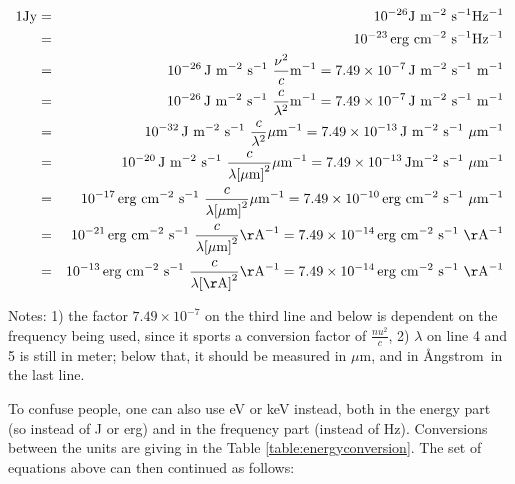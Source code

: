 \documentclass[12pt,a4paper]{article}
\newcommand{\micron}{\ensuremath{\mu \mathrm{m}}}
\newcommand{\Angstrom}{{\AA}ngstrom}
\newcommand{\jmsqshz}{\ensuremath{\mathrm{J}\ \mathrm{m}^{-2}\ \mathrm{s^{-1}} \mathrm{Hz^{-1}}}}
\newcommand{\ergcmsqshz}{\ensuremath{\mathrm{erg}\ \mathrm{cm}^{-2}\ \mathrm{s^{-1}} \mathrm{Hz^{-1}}}}
\begin{document}
\begin{eqnarray*}
1 \mathrm{Jy} & = & 10^{-26} \jmsqshz \\
& = & 10^{-23}\, \ergcmsqshz \\
& = & 10^{-26}\, \mathrm{J}\ \mathrm{m}^{-2}\ \mathrm{s}^{-1}\ \frac{\nu^2}{c} \mathrm{m}^{-1} = 7.49 \times 10^{-7}\, \mathrm{J}\ \mathrm{m}^{-2}\ \mathrm{s}^{-1}\ \mathrm{m}^{-1} \\
& = & 10^{-26}\, \mathrm{J}\ \mathrm{m}^{-2}\ \mathrm{s}^{-1}\ \frac{c}{\lambda^2} \mathrm{m}^{-1} = 7.49 \times 10^{-7}\, \mathrm{J}\ \mathrm{m}^{-2}\ \mathrm{s}^{-1}\ \mathrm{m}^{-1} \\
& = & 10^{-32}\, \mathrm{J}\ \mathrm{m}^{-2}\ \mathrm{s}^{-1}\ \frac{c}{\lambda^2} \micron^{-1} = 7.49 \times 10^{-13}\, \mathrm{J}\ \mathrm{m}^{-2}\ \mathrm{s}^{-1}\ \micron^{-1} \\
& = & 10^{-20}\, \mathrm{J}\ \mathrm{m}^{-2}\ \mathrm{s}^{-1}\ \frac{c}{{\lambda[\micron]}^2} \micron^{-1} = 7.49 \times 10^{-13}\, \mathrm{J} \mathrm{m}^{-2}\ \mathrm{s}^{-1}\ \micron^{-1} \\
& = & 10^{-17}\, \mathrm{erg}\ \mathrm{cm}^{-2}\ \mathrm{s}^{-1}\ \frac{c}{{\lambda[\micron]}^2} \micron^{-1} = 7.49 \times 10^{-10}\, \mathrm{erg}\ \mathrm{cm}^{-2}\ \mathrm{s}^{-1}\ \micron^{-1} \\
& = & 10^{-21}\, \mathrm{erg}\ \mathrm{cm}^{-2}\ \mathrm{s}^{-1}\ \frac{c}{{\lambda[\micron]}^2} \mathrm{\AA}^{-1} = 7.49 \times 10^{-14}\, \mathrm{erg}\ \mathrm{cm}^{-2}\ \mathrm{s}^{-1}\ \mathrm{\AA}^{-1} \\
& = & 10^{-13}\, \mathrm{erg}\ \mathrm{cm}^{-2}\ \mathrm{s}^{-1}\ \frac{c}{{\lambda[\mathrm{\AA}]}^2} \mathrm{\AA}^{-1} = 7.49 \times 10^{-14}\, \mathrm{erg}\ \mathrm{cm}^{-2}\ \mathrm{s}^{-1}\ \mathrm{\AA}^{-1} \\
\end{eqnarray*}

Notes: 1) the factor $7.49 \times 10^{-7}$ on the third line and below is dependent on the frequency being used, since it sports a conversion factor of $\frac{nu^2}{c}$, 2) $\lambda$ on line 4 and 5 is still in meter; below that, it should be measured in \micron, and in \Angstrom\ in the last line.

To confuse people, one can also use eV or keV instead, both in the energy part (so instead of J or erg) and in the frequency part (instead of Hz). Conversions between the units are giving in the Table \ref{table:energyconversion}. The set of equations above can then continued as follows:
\end{document}
